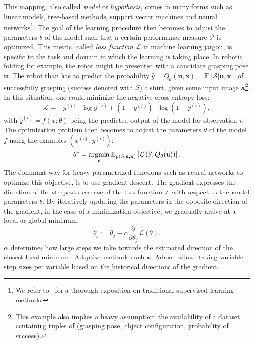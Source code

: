 \documentclass[\home/main.tex]{subfiles}
\begin{document}
This mapping, also called \textit{model} or \textit{hypothesis}, comes in many forms such as linear models, tree-based methods, support vector machines and neural networks\footnote{We refer to~\textcite{Murphy2012, Bishop2006, Hastie2001} for a thorough exposition on traditional supervised learning methods.}.
The goal of the learning procedure then becomes to adjust the parameters $\theta$ of the model such that a certain performance measure $\mathcal{P}$ is optimized. This metric, called \textit{loss function} $\mathcal{L}$ in machine learning jargon, is specific to the task and domain in which the learning is taking place. In robotic folding for example, the robot might be presented with a candidate grasping pose $\mathbf{u}$. The robot than has to predict the probability $\hat{y} = Q_{\theta}(\mathbf{u}, \mathbf{x}) = \mathbb{E}\left[ \mathcal{S} | \mathbf{u}, \mathbf{x} \right]$ of successfully grasping (success denoted with $S$) a shirt, given some input image $\mathbf{x}$\footnote{This example also implies a heavy assumption; the availability of a dataset containing tuples of (grasping pose, object configuration, probability of success).}.
In this situation, one could minimize the negative cross-entropy loss:
\begin{equation*}
	\mathcal{L}=-y^{(i)} \cdot \log \hat{y}^{(i)} +\left(1-y^{(i)}\right) \cdot \log \left(1-\hat{y}^{(i)}\right),
\end{equation*} with $\hat{y}^{(i)} = f(x;\theta)$ being the predicted output of the model for observation $i$.
The optimization problem then becomes to adjust the parameters $\theta$ of the model $f$ using the examples $\left(x^{(i)}, y^{(i)}\right)$:
\begin{equation*}
	\theta^{*}=\underset{\theta}{\operatorname*{argmin}} \: \mathbb{E}_{p(S, \mathbf{u}, \mathbf{x})}\left[\mathcal{L}\left(S, Q_{\theta}(\mathbf{u})\right)\right].
\end{equation*}
The dominant way for heavy parametrized functions such as neural networks to optimize this objective, is to use gradient descent. The gradient expresses the direction of the steepest decrease of the loss function $\mathcal{L}$ with respect to the model parameters $\theta$. By iteratively updating the parameters in the opposite direction of the gradient, in the case of a minimization objective, we gradually arrive at a local or global minimum:
\begin{equation*}
	\theta_{j}:=\theta_{j}-\alpha \frac{\partial}{\partial \theta_{j}} \mathcal{L}(\theta).
\end{equation*}
$\alpha$ determines how large steps we take towards the estimated direction of the closest local minimum. Adaptive methods such as Adam~\autocite{Kingma2014} allows taking variable step sizes per variable based on the historical directions of the gradient.
\end{document}
